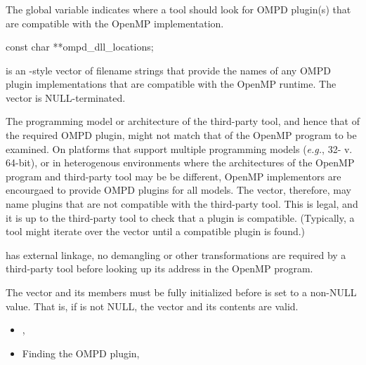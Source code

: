 \subsubsection{}
\label{ompd:ompd_dll_locations}

\summary
The global variable  indicates
where a tool should look for OMPD plugin(s) that are compatible 
with the OpenMP implementation.  

\cspecificstart
\begin{ompSyntax}
const char **ompd_dll_locations;
\end{ompSyntax}
\cspecificend


\descr
{} is an -style vector of filename
strings that provide the names of any OMPD plugin implementations
that are compatible with the OpenMP runtime.
The vector is NULL-terminated.

The programming model or architecture of the third-party tool, and
hence that of the required OMPD plugin, might not match that of
the OpenMP program to be examined.
On platforms that support multiple programming models (\textit{e.g.},
32- v. 64-bit), or in heterogenous  environments where the architectures
of the OpenMP program and third-party tool may be be different,
OpenMP implementors are encourgaed to provide OMPD plugins for all models.
The vector, therefore, may name plugins that are not compatible
with the third-party tool.
This is legal, and it is up to the third-party tool to check that
a plugin is compatible.
(Typically, a tool might iterate over the vector until a compatible
plugin is found.)

\restrictions
{} has external  linkage,
no demangling or other transformations are required by a third-party
tool before looking up its address in the OpenMP program.

The vector and its members must be fully initialized before
 is set to a non-NULL value.
That is, if  is not NULL, the vector
and its contents are valid.

\crossreferences
\begin{itemize}
\item
  , 
\item
  Finding the OMPD plugin, 
\end{itemize}

